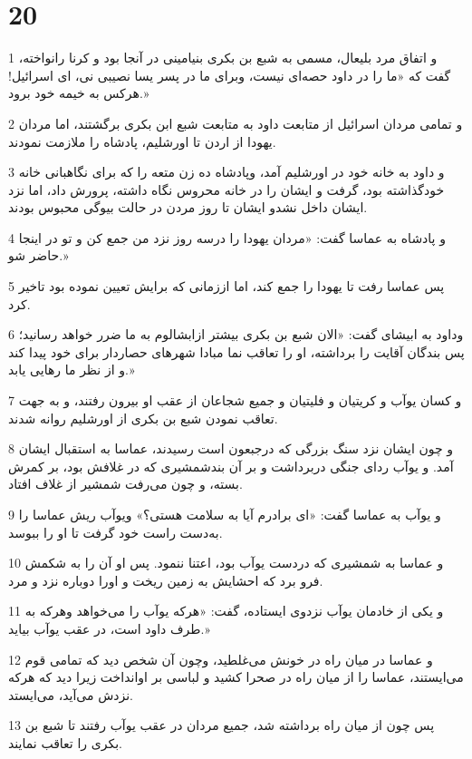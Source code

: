 \chapter{20}

\par 1 و اتفاق مرد بلیعال، مسمی به شبع بن بکری بنیامینی در آنجا بود و کرنا رانواخته، گفت که «ما را در داود حصه‌ای نیست، وبرای ما در پسر یسا نصیبی نی، ای اسرائیل! هرکس به خیمه خود برود.»
\par 2 و تمامی مردان اسرائیل از متابعت داود به متابعت شبع ابن بکری برگشتند، اما مردان یهودا از اردن تا اورشلیم، پادشاه را ملازمت نمودند.
\par 3 و داود به خانه خود در اورشلیم آمد، وپادشاه ده زن متعه را که برای نگاهبانی خانه خودگذاشته بود، گرفت و ایشان را در خانه محروس نگاه داشته، پرورش داد، اما نزد ایشان داخل نشدو ایشان تا روز مردن در حالت بیوگی محبوس بودند.
\par 4 و پادشاه به عماسا گفت: «مردان یهودا را درسه روز نزد من جمع کن و تو در اینجا حاضر شو.»
\par 5 پس عماسا رفت تا یهودا را جمع کند، اما اززمانی که برایش تعیین نموده بود تاخیر کرد.
\par 6 وداود به ابیشای گفت: «الان شبع بن بکری بیشتر ازابشالوم به ما ضرر خواهد رسانید؛ پس بندگان آقایت را برداشته، او را تعاقب نما مبادا شهرهای حصاردار برای خود پیدا کند و از نظر ما رهایی یابد.»
\par 7 و کسان یوآب و کریتیان و فلیتیان و جمیع شجاعان از عقب او بیرون رفتند، و به جهت تعاقب نمودن شبع بن بکری از اورشلیم روانه شدند.
\par 8 و چون ایشان نزد سنگ بزرگی که درجبعون است رسیدند، عماسا به استقبال ایشان آمد. و یوآب ردای جنگی دربرداشت و بر آن بندشمشیری که در غلافش بود، بر کمرش بسته، و چون می‌رفت شمشیر از غلاف افتاد.
\par 9 و یوآب به عماسا گفت: «ای برادرم آیا به سلامت هستی؟» ویوآب ریش عماسا را به‌دست راست خود گرفت تا او را ببوسد.
\par 10 و عماسا به شمشیری که دردست یوآب بود، اعتنا ننمود. پس او آن را به شکمش فرو برد که احشایش به زمین ریخت و اورا دوباره نزد و مرد.
\par 11 و یکی از خادمان یوآب نزدوی ایستاده، گفت: «هرکه یوآب را می‌خواهد وهرکه به طرف داود است، در عقب یوآب بیاید.»
\par 12 و عماسا در میان راه در خونش می‌غلطید، وچون آن شخص دید که تمامی قوم می‌ایستند، عماسا را از میان راه در صحرا کشید و لباسی بر اوانداخت زیرا دید که هر‌که نزدش می‌آید، می‌ایستد.
\par 13 پس چون از میان راه برداشته شد، جمیع مردان در عقب یوآب رفتند تا شبع بن بکری را تعاقب نمایند.
